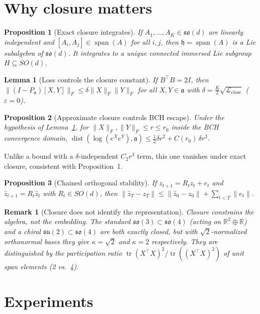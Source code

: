 \documentclass[10pt]{article}
\newtheorem{proposition}{Proposition}
\newtheorem{lemma}{Lemma}
\newtheorem{remark}{Remark}
\newcommand{\so}{\mathfrak{so}}
\newcommand{\Lclose}{\mathcal{L}_{\mathrm{close}}}
\begin{document}
\section{Why closure matters}
\begin{proposition}[Exact closure integrates]
If $A_1,\dots,A_K\in\so(d)$ are linearly independent and $[A_i,A_j]\in\operatorname{span}(A)$ for all $i,j$, then
$\mathfrak h=\operatorname{span}(A)$ is a Lie subalgebra of $\so(d)$. It integrates to a unique connected immersed
Lie subgroup $H\subseteq SO(d)$.
\end{proposition}
\begin{lemma}[Loss controls the closure constant]\label{lem:delta}
If $B^\top B=2I$, then $\|(I-P_{\mathfrak a})[X,Y]\|_F\le\delta\|X\|_F\|Y\|_F$ for all $X,Y\in\mathfrak a$ with
$\delta=\tfrac K2\sqrt{\Lclose}$ ($\varepsilon=0$).
\end{lemma}
\begin{proposition}[Approximate closure controls BCH escape]\label{prop:bch}
Under the hypothesis of Lemma~\ref{lem:delta}, for $\|X\|_F,\|Y\|_F\le r\le r_0$ inside the BCH convergence domain,
$\operatorname{dist}(\log(e^Xe^Y),\mathfrak a)\le\tfrac12\delta r^2+C(r_0)\,\delta r^3$.
\end{proposition}
Unlike a bound with a $\delta$-independent $C_2r^3$ term, this one vanishes under exact closure, consistent with
Proposition~1.
\begin{proposition}[Chained orthogonal stability]
If $z_{t+1}=R_tz_t+e_t$ and $\hat z_{t+1}=R_t\hat z_t$ with $R_t\in SO(d)$, then
$\|\hat z_T-z_T\|\le\|\hat z_0-z_0\|+\sum_{t<T}\|e_t\|$.
\end{proposition}
\begin{remark}[Closure does not identify the representation]
Closure constrains the algebra, not the embedding. The standard $\so(3)\subset\so(4)$ (acting on $\mathbb R^3\oplus\mathbb R$)
and a chiral $\mathfrak{su}(2)\subset\so(4)$ are both exactly closed, but with $\sqrt2$-normalized orthonormal bases
they give $\kappa=\sqrt2$ and $\kappa=2$ respectively. They are distinguished by the participation ratio
$\operatorname{tr}(X^\top X)^2/\operatorname{tr}((X^\top X)^2)$ of unit span elements (2 vs.\ 4).
\end{remark}

\section{Experiments}
\end{document}
